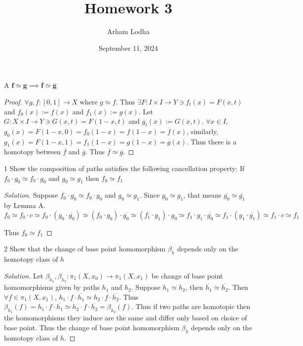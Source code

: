 \documentclass{article}
\newcommand*{\x}{\times}
\newenvironment{solution}
{\renewcommand\qedsymbol{$\blacksquare$}\begin{proof}[Solution]}
{\end{proof}}
\begin{document}
\title{Homework 3}
\author{Arham Lodha}%
\date{September 11, 2024}%
\maketitle

\begin{LEM}{A}
    $\mathbf{f \simeq g \implies \overline{f} \simeq \overline{g}}$
\end{LEM}
\begin{proof}
    $\forall g, f: [0, 1] \to X$ where $g \simeq f$. Thus $\exists F: I \x I \to Y \ni f_t(x) = F(x, t)$ and $f_0(x) := f(x)$ and $f_1(x) := g(x)$. Let $G: X \x I \to Y \ni G(x, t) = F(1 - x, t)$ and $g_t(x) := G(x, t)$. $\forall x \in I$, $g_0(x) = F(1 - x, 0) = f_0(1 - x) = f(1 - x) = \overline{f}(x)$, similarly, $g_1(x) = F(1 - x, 1) = f_1(1 -x) = g(1 - x) = \overline{g}(x)$. Thus there is a homotopy between $\overline{f}$ and $\overline{g}$. Thus $\overline{f} \simeq \overline{g}$.
\end{proof}

\begin{PROB}{1}\label{Problem 1.}
    Show the composition of paths satisfies the following cancellation property: If $f_0 \cdot g_0 \simeq f_0 \cdot g_0$ and $g_0 \simeq g_1$ then $f_0 \simeq f_1$    
\end{PROB}
\begin{solution}
    Suppose $f_0 \cdot g_0 \simeq f_0 \cdot g_0$ and $g_0 \simeq g_1$. 
    Since $g_0 \simeq g_1$, that means $\overline{g_0} \simeq \overline{g_1}$ by Lemma A. 
    \[
    f_0 \simeq f_0 \cdot c \simeq f_0 \cdot (g_0 \cdot \overline{g_0}) \simeq (f_0 \cdot g_0) \cdot \overline{g_0} \simeq (f_1 \cdot g_1) \cdot g_0 \simeq f_1 \cdot g_1 \cdot \overline{g_0} \simeq f_1 \cdot (g_1 \cdot \overline{g_1}) \simeq f_1 \cdot c \simeq f_1
    \]

    Thus $f_0 \simeq f_1$ 
\end{solution}
\bigskip

\begin{PROB}{2}\label{Problem 2.}
    Show that the change of base point homomorphism $\beta_h$ depends only on the homotopy class of $h$  
\end{PROB}
\begin{solution}
    Let $\beta_{h_1}, \beta_{h_2} : \pi_1(X, x_0) \to \pi_1(X, x_1)$ be change of base point homomorphisms given by paths $h_1$ and $h_2$. Suppose $h_1 \simeq h_2$, then $\overline{h_1} \simeq \overline{h_2}$. Then $\forall f \in \pi_1(X, x_1)$, $h_1 \cdot f \cdot \overline{h_1} \simeq h_2 \cdot f \cdot \overline{h_2}$. Thus $\beta_{h_1}(f) = h_1 \cdot f \cdot \overline{h_1} \simeq h_2 \cdot f \cdot \overline{h_2} = \beta_{h_2}(f)$. Thus if two paths are homotopic then the homomorphisms they induce are the same and differ only based on choice of base point. Thus the change of base point homomorphism $\beta_h$ depends only on the homotopy class of $h$.            
\end{solution}
\end{document}
